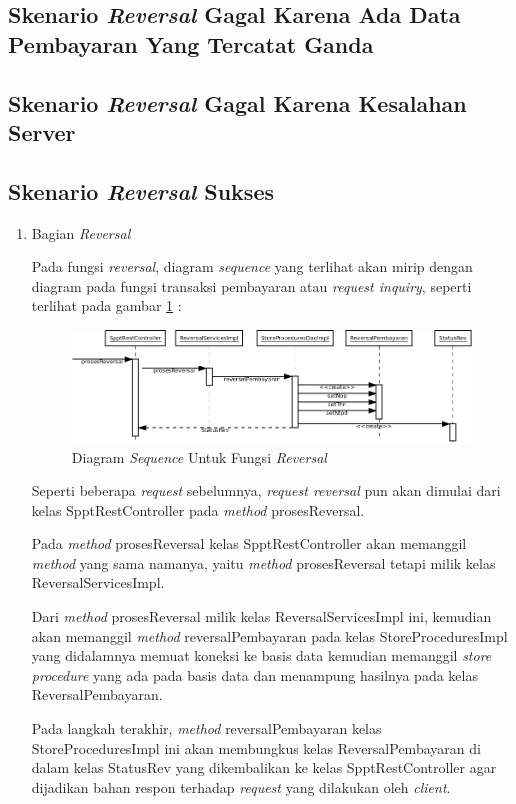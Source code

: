 \subsection{Skenario \textit{Reversal} Gagal Karena Ada Data Pembayaran Yang Tercatat Ganda}
\subsection{Skenario \textit{Reversal} Gagal Karena Kesalahan Server}
\subsection{Skenario \textit{Reversal} Sukses}

\begin{enumerate}
  
 
  
  \item Bagian \textit{Reversal}
  
  Pada fungsi \textit{reversal}, diagram \textit{sequence} yang terlihat akan mirip dengan diagram pada fungsi transaksi pembayaran atau \textit{request inquiry}, seperti terlihat pada gambar \ref{fig:uml-seq-rev} :
  
  \begin{figure}[H]
    \centering
    \includegraphics[width=1\textwidth]{./resources/uml/uml-seq-rev}
    \caption{Diagram \textit{Sequence} Untuk Fungsi \textit{Reversal}}
    \label{fig:uml-seq-rev}
  \end{figure}
  
  Seperti beberapa \textit{request} sebelumnya, \textit{request reversal} pun akan dimulai dari kelas SpptRestController pada \textit{method} prosesReversal.
  
  Pada \textit{method} prosesReversal kelas SpptRestController akan memanggil \textit{method} yang sama namanya, yaitu \textit{method} prosesReversal tetapi milik kelas ReversalServicesImpl.
  
  Dari \textit{method} prosesReversal milik kelas ReversalServicesImpl ini, kemudian akan memanggil \textit{method} reversalPembayaran pada kelas StoreProceduresImpl yang didalamnya memuat koneksi ke basis data kemudian memanggil \textit{store procedure} yang ada pada basis data dan menampung hasilnya pada kelas ReversalPembayaran.
  
  Pada langkah terakhir, \textit{method} reversalPembayaran kelas StoreProceduresImpl ini akan membungkus kelas ReversalPembayaran di dalam kelas StatusRev yang dikembalikan ke kelas SpptRestController agar dijadikan bahan respon terhadap \textit{request} yang dilakukan oleh \textit{client}.
\end{enumerate}
